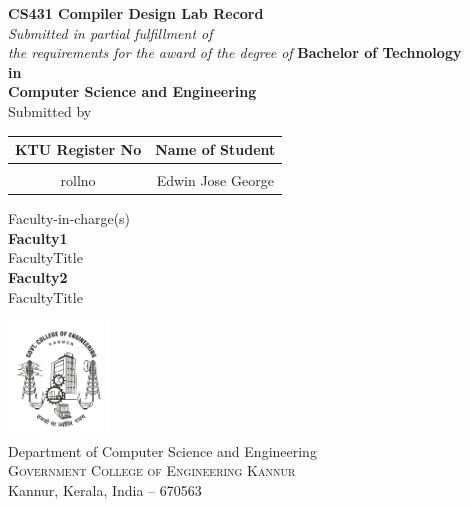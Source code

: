 \begin{titlepage}
	\clearpage
	\vspace*{\fill}
	\thispagestyle{empty}
	\begin{onehalfspace}
	\begin{center}
			
		\textup{\large{\bf CS431 Compiler Design Lab Record}}
		\\[0.2in]
		
       \small \textit{Submitted in partial fulfillment of\\ the requirements for the award of the degree of}
		\vspace{.2in}
		{\bf Bachelor of Technology \\in\\ Computer Science and Engineering}\\[0.5in]
		
		\normalsize Submitted by \\
		\begin{table}[h]
			\centering
			\begin{tabular}{cc}
				KTU Register No & Name of Student
				\\ \hline \\
				rollno      & Edwin Jose George
			\end{tabular}
		\end{table}
		
		\vspace{.1in}
		Faculty-in-charge(s)\\ [0.1in]
		\textbf{Faculty1}\\ 
		FacultyTitle\\ [0.1in]
		\textbf{Faculty2}\\
		FacultyTitle \\ [0.2in]
		
		\vfill
	
		\includegraphics[width=0.2\textwidth]{./gcek_logo.jpg}\\[0.1in]
		\Large{Department of Computer Science and Engineering}\\
		\normalsize \textsc{Government College of Engineering Kannur}\\ Kannur, Kerala, India -- 670563 \\
		\vspace{0.2cm}
	
	\end{center}
	\end{onehalfspace}
	\vspace*{\fill}
\end{titlepage}
